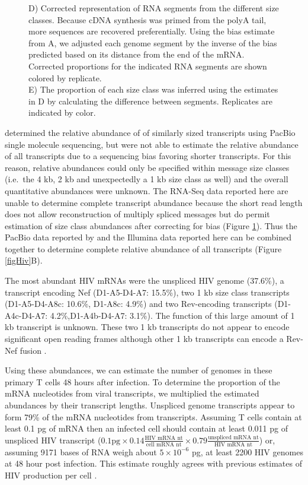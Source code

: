 \documentclass[../sherrill-Mix_thesis.tex]{subfiles}
\begin{document}
\begin{figure}
{{						D) Corrected representation of RNA segments from the different size classes. Because cDNA synthesis was primed from the polyA tail, more \threePrime{} sequences are recovered preferentially. Using the bias estimate from A, we adjusted each genome segment by the inverse of the bias predicted based on its distance from the \threePrime{} end of the mRNA. Corrected proportions for the indicated RNA segments are shown colored by replicate. \\
						E) The proportion of each size class was inferred using the estimates in D by calculating the difference between segments. Replicates are indicated by color.
				}
					\label{figCalculations}
				}
		\end{figure}

		\citet{Ocwieja2012} determined the relative abundance of \hivEight{} of similarly sized transcripts using PacBio single molecule sequencing, but were not able to estimate the relative abundance of all transcripts due to a sequencing bias favoring shorter transcripts.  For this reason, relative abundances could only be specified within message size classes (i.e.\  the 4 kb, 2 kb and unexpectedly a 1 kb size class as well) and the overall quantitative abundances were unknown.  The RNA-Seq data reported here are unable to determine complete transcript abundance because the short read length does not allow reconstruction of multiply spliced messages but do permit estimation of size class abundances after correcting for \threePrime{} bias (Figure \ref{figCalculations}). Thus the PacBio data reported by \citet{Ocwieja2012} and the Illumina data reported here can be combined together to determine complete relative abundance of all \hivEight{} transcripts (Figure \ref{figHiv}B). 

	   The most abundant HIV mRNAs were the unspliced HIV genome (37.6\%), a transcript encoding Nef (D1-A5-D4-A7: 15.5\%), two 1 kb size class transcripts (D1-A5-D4-A8c: 10.6\%, D1-A8c: 4.9\%) and two Rev-encoding transcripts (D1-A4c-D4-A7: 4.2\%,D1-A4b-D4-A7: 3.1\%). The function of this large amount of 1 kb transcript is unknown. These two 1 kb transcripts do not appear to encode significant open reading frames although other 1 kb transcripts can encode a Rev-Nef fusion \citep{Ocwieja2012}. 

		Using these abundances, we can estimate the number of \hivEight{} genomes in these pri\-mary T cells 48 hours after infection.  To determine the proportion of the mRNA nucleotides from viral transcripts, we multiplied the estimated abundances by their tran\-script lengths. Unspliced genome tran\-scripts appear to form 79\% of the mRNA nucleotides from \hivEight{} transcripts. Assuming T cells contain at least 0.1 pg of mRNA then an infected cell should contain at least 0.011 pg of unspliced HIV transcript ($0.1 \textrm{pg} \times 0.14\frac{\textrm{HIV mRNA nt}}{\textrm{cell mRNA nt}}\times 0.79\frac{\textrm{unspliced mRNA nt}}{\textrm{HIV mRNA nt}}$) or, assuming 9171 bases of RNA weigh about $5 \times 10^{-6}$ pg, at least 2200 HIV genomes at 48 hour post infection. This estimate rough\-ly agrees with previous estimates of HIV production per cell \citep{Hockett1999,DeBoer2010,Whisnant2013}. 
\end{document}
